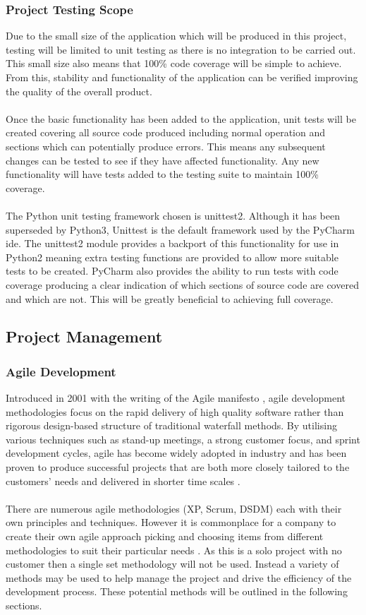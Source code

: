 	\subsubsection{Project Testing Scope}\label{sec:project_testing_scope}
		Due to the small size of the application which will be produced in this project, testing will be limited to unit testing as there is no integration to be carried out. This small size also means that 100\% code coverage will be simple to achieve. From this, stability and functionality of the application can be verified improving the quality of the overall product.
		\\\\
		Once the basic functionality has been added to the application, unit tests will be created covering all source code produced including normal operation and sections which can potentially produce errors. This means any subsequent changes can be tested to see if they have affected functionality. Any new functionality will have tests added to the testing suite to maintain 100\% coverage.
		\\\\
		The Python unit testing framework chosen is unittest2. Although it has been superseded by Python3, Unittest is the default framework used by the PyCharm \gls{ide}. The unittest2 module provides a backport of this functionality for use in Python2 meaning extra testing functions are provided to allow more suitable tests to be created. PyCharm also provides the ability to run tests with code coverage producing a clear indication of which sections of source code are covered and which are not. This will be greatly beneficial to achieving full coverage.
\subsection{Project Management}\label{sec:project_management}
	\subsubsection{Agile Development}
		Introduced in 2001 with the writing of the Agile manifesto \citep{beck2001manifesto}, agile development methodologies focus on the rapid delivery of high quality software rather than rigorous design-based structure of traditional waterfall methods. By utilising various techniques such as stand-up meetings, a strong customer focus, and sprint development cycles, agile has become widely adopted in industry and has been proven to produce successful projects that are both more closely tailored to the customers’ needs and delivered in shorter time scales \citep{state_of_agile_2015}.
		\\\\
		There are numerous agile methodologies (XP, Scrum, DSDM) each with their own principles and techniques. However it is commonplace for a company to create their own agile approach picking and choosing items from different methodologies to suit their particular needs \citep{aydin2004agile}. As this is a solo project with no customer then a single set methodology will not be used. Instead a variety of methods may be used to help manage the project and drive the efficiency of the development process. These potential methods will be outlined in the following sections.
